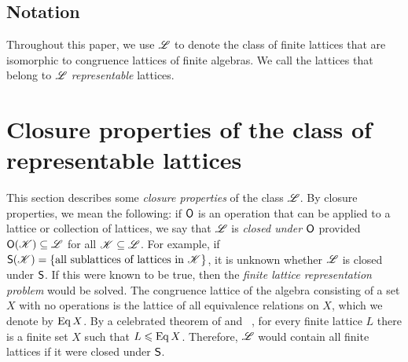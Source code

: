 \subsection{Notation}

Throughout this paper, we use $\mathscr{L}$ to denote the class of finite lattices that
are isomorphic to congruence lattices of finite algebras. 
We call the lattices that belong to $\mathscr{L}$ \emph{representable} lattices. 


\section{Closure properties of the class of representable lattices}
\label{sec:clos-prop-class}
This section describes some
\emph{closure properties}
of the class $\mathscr{L}$. %
By closure properties, we mean the following: if $\mathsf{O}$ is an operation that can
be applied to a lattice or collection of lattices, we say that $\mathscr{L}$ is
\emph{closed under $\mathsf{O}$} provided $\mathsf{O}(\mathscr{K}) \subseteq \mathscr{L}$ for all 
$\mathscr{K}\subseteq \mathscr{L}$. For example, if 
$\mathsf{S}(\mathscr{K}) = \{\text{all sublattices of lattices in $\mathscr{K}$}\}$, 
it is unknown whether $\mathscr{L}$ is closed under $\mathsf{S}$.  
If this were known to be true, then the 
\emph{finite lattice representation problem} would be solved.
The congruence lattice of the algebra consisting of a
set $X$ with no operations is the lattice of all equivalence relations on $X$,
which we denote by $\operatorname{Eq} X$.
By a celebrated theorem of \Pudlak and \Tuma~\cite{Pudlak:1980}, for every finite
lattice $L$ there is a finite set $X$ such that $L\leqslant \operatorname{Eq} X$.  Therefore, $\mathscr{L}$
would contain all finite lattices if it were closed under $\mathsf{S}$.


